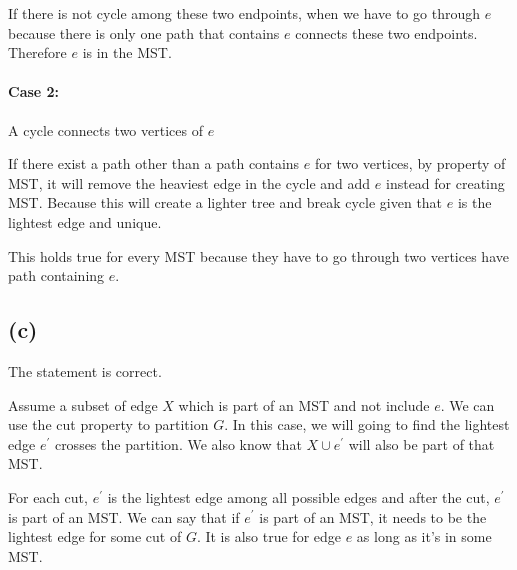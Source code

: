 \documentclass{article}
\begin{document}
If there is not cycle among these two endpoints, when we have to go through $e$ because there is 
only one path that contains $e$ connects these two endpoints. Therefore $e$ is in the MST.

\paragraph*{Case 2:} A cycle connects two vertices of $e$

If there exist a path other than a path contains $e$ for two vertices, by property of MST, it will remove the
heaviest edge in the cycle and add $e$ instead for creating MST. Because this will create a lighter tree and break
cycle given that $e$ is the lightest edge and unique.

This holds true for every MST because they have to go through two vertices have path containing $e$.

\subsection*{(c)}
The statement is correct.

Assume a subset of edge $X$ which is part of an MST and not include $e$. We can use the cut property
to partition $G$. In this case, we will going to find the lightest edge $e^\prime$ crosses the partition.
We also know that $X \cup e^\prime$ will also be part of that MST.

For each cut, $e^\prime$ is the lightest edge among all possible edges and after the cut, $e^\prime$ is part of an MST.
We can say that if $e^\prime$ is part of an MST, it needs to be the lightest edge for some cut of $G$. It is also true 
for edge $e$ as long as it's in some MST.
\end{document}
